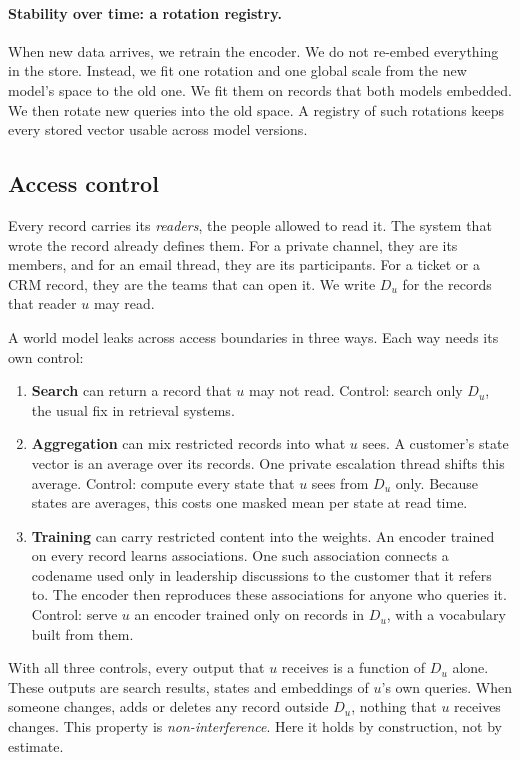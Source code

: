\documentclass[11pt]{article}
\begin{document}
\paragraph{Stability over time: a rotation registry.}
When new data arrives, we retrain the encoder. We do not re-embed everything in the store. Instead, we fit one rotation and one global scale from the new model's space to the old one. We fit them on records that both models embedded. We then rotate new queries into the old space. A registry of such rotations keeps every stored vector usable across model versions.

\subsection{Access control}
\label{sec:acl}
Every record carries its \emph{readers}, the people allowed to read it. The system that wrote the record already defines them. For a private channel, they are its members, and for an email thread, they are its participants. For a ticket or a CRM record, they are the teams that can open it. We write $D_u$ for the records that reader $u$ may read.

A world model leaks across access boundaries in three ways. Each way needs its own control:
\begin{enumerate}[label=(\roman*)]
\item \textbf{Search} can return a record that $u$ may not read. Control: search only $D_u$, the usual fix in retrieval systems.
\item \textbf{Aggregation} can mix restricted records into what $u$ sees. A customer's state vector is an average over its records. One private escalation thread shifts this average. Control: compute every state that $u$ sees from $D_u$ only. Because states are averages, this costs one masked mean per state at read time.
\item \textbf{Training} can carry restricted content into the weights. An encoder trained on every record learns associations. One such association connects a codename used only in leadership discussions to the customer that it refers to. The encoder then reproduces these associations for anyone who queries it. Control: serve $u$ an encoder trained only on records in $D_u$, with a vocabulary built from them.
\end{enumerate}
With all three controls, every output that $u$ receives is a function of $D_u$ alone. These outputs are search results, states and embeddings of $u$'s own queries. When someone changes, adds or deletes any record outside $D_u$, nothing that $u$ receives changes. This property is \emph{non-interference}\citep{tiwari2024ifc}. Here it holds by construction, not by estimate.
\end{document}
